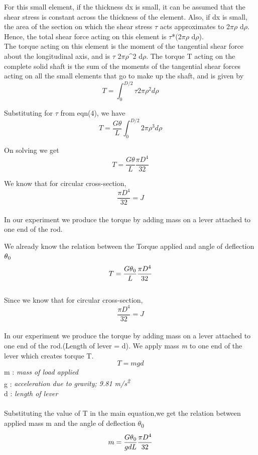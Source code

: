 \documentclass[12pt,a4paper]{article}	%
\begin{document}
For this small element, if the thickness dx is small, it can be assumed that the shear stress is constant across the thickness of the element. Also, if dx is small, the area of the section on which the shear stress $\tau$ acts approximates to 2$\pi$$\rho$ d$\rho$. Hence, the total shear force acting on this element is $\tau$*(2$\pi$$\rho$ d$\rho$).\\

The torque acting on this element is the moment of the tangential shear force about the longitudinal axis, and is $\tau$ 2$\pi$$\rho$^2 d$\rho$. The torque T acting on the complete solid shaft is the sum of the moments of the tangential shear forces acting on all the small elements that go to make up the shaft, and is given by\\

\[ T= \int_{0}^{D/2}\tau2\pi \rho^2 d\rho\]

Substituting for $\tau$ from eqn(4), we have\\

\[T=\frac{G \theta}{L} \int_{0}^{D/2}2\pi \rho^3 d\rho\]

On solving we get\\
\[T=\frac{G \theta}{L}  \frac{\pi D^4}{32}\]

We know that for circular cross-section,\\
\[\frac{\pi D^4}{32}=J\]
\thispagestyle{empty}	%
\\

In our experiment we produce the torque by adding mass on a lever attached to one end of the rod.
\thispagestyle{empty}	%

We already know the relation between the Torque applied and angle of deflection $\theta\textsubscript{0}$\\
\[T=\frac{G \theta\textsubscript{0} } {L}  \frac{\pi D^4}{32}\]
\\
Since we know that for circular cross-section,
\[\frac{\pi D^4}{32}=J\]
\thispagestyle{empty}	%
\\
In our experiment we produce the torque by adding mass on a lever attached to one end of the rod.(Length of lever = d).
We apply mass \textit{m} to one end of the lever which creates torque T.
\[T = mgd\]
m : \textit{mass of load applied}\\
g : \textit{acceleration due to gravity; 9.81 m/s\textsuperscript{2}}\\
d : \textit{length of lever} \\
\\
Substituting the value of T in the main equation,we get the relation between applied mass m and the angle of deflection $\theta$\textsubscript{0}\\
\[m=\frac{G \theta\textsubscript{0} } {gdL}  \frac{\pi D^4}{32}\]




\thispagestyle{empty}	%
\end{document}
